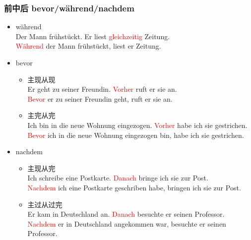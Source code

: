 \subsubsection{前中后 bevor/während/nachdem}
\begin{itemize}
    \item während \\
          Der Mann frühstückt. Er liest \textcolor{red}{gleichzeitig} Zeitung. \\
          \textcolor{red}{Während} der Mann frühstückt, liest er Zeitung.
    \item bevor
          \begin{itemize}
              \item 主现从现 \\
                    Er geht zu seiner Freundin. \textcolor{red}{Vorher} ruft er sie an. \\
                    \textcolor{red}{Bevor} er zu seiner Freundin geht, ruft er sie an.
              \item 主完从完 \\
                    Ich bin in die neue Wohnung eingezogen. \textcolor{red}{Vorher} habe ich sie gestrichen. \\
                    \textcolor{red}{Bevor} ich in die neue Wohnung eingezogen bin, habe ich sie gestrichen.
          \end{itemize}
    \item nachdem
          \begin{itemize}
              \item 主现从完 \\
                    Ich schreibe eine Postkarte. \textcolor{red}{Danach} bringe ich sie zur Post. \\
                    \textcolor{red}{Nachdem} ich eine Postkarte geschriben habe, bringen ich sie zur Post.
              \item 主过从过完 \\
                    Er kam in Deutschland an. \textcolor{red}{Danach} besuchte er seinen Professor. \\
                    \textcolor{red}{Nachdem} er in Deutschland angekommen war, besuchte er seinen Professor.
          \end{itemize}
\end{itemize}


